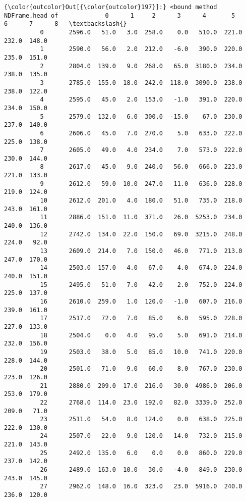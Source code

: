 \documentclass[11pt]{article}
\begin{document}
            \begin{Verbatim}[commandchars=\\\{\}]
{\color{outcolor}Out[{\color{outcolor}197}]:} <bound method NDFrame.head of             0      1     2      3      4       5      6      7      8   \textbackslash{}
          0       2596.0   51.0   3.0  258.0    0.0   510.0  221.0  232.0  148.0   
          1       2590.0   56.0   2.0  212.0   -6.0   390.0  220.0  235.0  151.0   
          2       2804.0  139.0   9.0  268.0   65.0  3180.0  234.0  238.0  135.0   
          3       2785.0  155.0  18.0  242.0  118.0  3090.0  238.0  238.0  122.0   
          4       2595.0   45.0   2.0  153.0   -1.0   391.0  220.0  234.0  150.0   
          5       2579.0  132.0   6.0  300.0  -15.0    67.0  230.0  237.0  140.0   
          6       2606.0   45.0   7.0  270.0    5.0   633.0  222.0  225.0  138.0   
          7       2605.0   49.0   4.0  234.0    7.0   573.0  222.0  230.0  144.0   
          8       2617.0   45.0   9.0  240.0   56.0   666.0  223.0  221.0  133.0   
          9       2612.0   59.0  10.0  247.0   11.0   636.0  228.0  219.0  124.0   
          10      2612.0  201.0   4.0  180.0   51.0   735.0  218.0  243.0  161.0   
          11      2886.0  151.0  11.0  371.0   26.0  5253.0  234.0  240.0  136.0   
          12      2742.0  134.0  22.0  150.0   69.0  3215.0  248.0  224.0   92.0   
          13      2609.0  214.0   7.0  150.0   46.0   771.0  213.0  247.0  170.0   
          14      2503.0  157.0   4.0   67.0    4.0   674.0  224.0  240.0  151.0   
          15      2495.0   51.0   7.0   42.0    2.0   752.0  224.0  225.0  137.0   
          16      2610.0  259.0   1.0  120.0   -1.0   607.0  216.0  239.0  161.0   
          17      2517.0   72.0   7.0   85.0    6.0   595.0  228.0  227.0  133.0   
          18      2504.0    0.0   4.0   95.0    5.0   691.0  214.0  232.0  156.0   
          19      2503.0   38.0   5.0   85.0   10.0   741.0  220.0  228.0  144.0   
          20      2501.0   71.0   9.0   60.0    8.0   767.0  230.0  223.0  126.0   
          21      2880.0  209.0  17.0  216.0   30.0  4986.0  206.0  253.0  179.0   
          22      2768.0  114.0  23.0  192.0   82.0  3339.0  252.0  209.0   71.0   
          23      2511.0   54.0   8.0  124.0    0.0   638.0  225.0  222.0  130.0   
          24      2507.0   22.0   9.0  120.0   14.0   732.0  215.0  221.0  143.0   
          25      2492.0  135.0   6.0    0.0    0.0   860.0  229.0  237.0  142.0   
          26      2489.0  163.0  10.0   30.0   -4.0   849.0  230.0  243.0  145.0   
          27      2962.0  148.0  16.0  323.0   23.0  5916.0  240.0  236.0  120.0   

\end{Verbatim}
\end{document}
